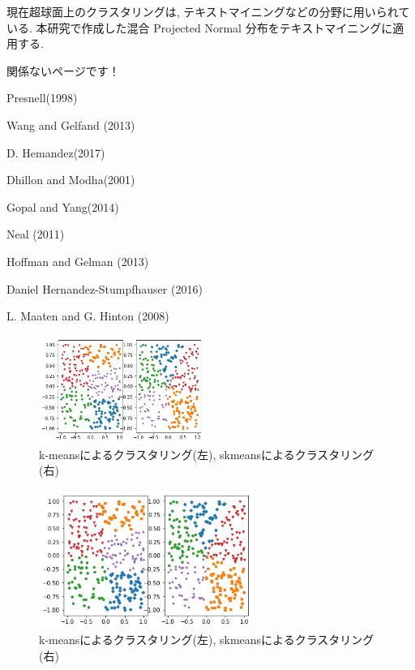 \documentclass[a4j,11pt]{jarticle}
\makeatletter
\def\section{\@startsection{section}{1}{\z@}
   {0.8\Cvs \@plus.5\Cdp \@minus.2\Cdp}
   {0.2\Cvs \@plus.3\Cdp}
   {\normalfont \Large \bfseries}}
\makeatother
\begin{document}
現在超球面上のクラスタリングは, テキストマイニングなどの分野に用いられている. 本研究で作成した混合 Projected Normal 分布をテキストマイニングに適用する.

{} %






\newpage

関係ないページです！

Presnell(1998) \cite{PML}

Wang and Gelfand (2013) \cite{PN1}

D. Hemandez(2017) \cite{GPN}

Dhillon and Modha(2001) \cite{SKMcluster}

Gopal and Yang(2014) \cite{Gopal}

Neal (2011) \cite{HMC}

Hoffman and Gelman (2013) \cite{NUTS}

Daniel Hernandez-Stumpfhauser (2016) \cite{SGPN}

L. Maaten and G. Hinton (2008) \cite{tSNE}

\vspace{-0.3cm}
\begin{figure}[H]
\begin{center}
\includegraphics[clip,height= 35mm]{data/kmeans+skmeans.png}
\end{center}
 \vspace{-0.9cm}
\caption{k-meansによるクラスタリング(左), skmeansによるクラスタリング(右)}
\label{skmeans}
\end{figure}

\begin{figure}
\vspace{-0.6cm}
\centering
\includegraphics[keepaspectratio,width=70mm]{data/kmeans+skmeans.png}
\vspace{-1cm}
\caption{k-meansによるクラスタリング(左), skmeansによるクラスタリング(右)}
\label{kmeans}
\end{figure}
\fi
\end{document}
